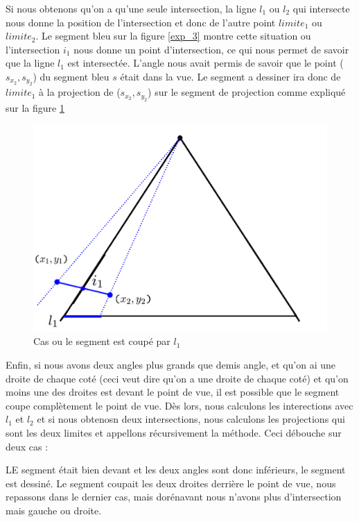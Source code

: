 \documentclass[11pt,a4paper]{article}
\theoremstyle{definition}
\theoremstyle{remark}
\begin{document}
Si nous obtenons qu'on a qu'une seule intersection, la ligne $l_1$ ou $l_2$ qui intersecte nous donne la position de l'intersection et donc de l'autre point $limite_1$ ou $limite_2$. Le segment bleu sur la figure \ref{exp_3} montre cette situation ou l'intersection $i_1$ nous donne un point d'intersection, ce qui nous permet de savoir que la ligne $l_1$ est intersectée. L'angle nous avait permis de savoir que le point ($s_{x_2},s_{y_2}$) du segment bleu $s$ était dans la vue. Le segment a dessiner ira donc de $limite_1$ à la projection de ($s_{x_2},s_{y_2}$) sur le segment de projection comme expliqué sur la figure \ref{cas2}

\begin{figure}[H]
\centering
\includegraphics[scale=0.6]{cas2.png}
\caption{Cas ou le segment est coupé par $l_1$}
\label{cas2}
\end{figure}

Enfin, si nous avons deux angles plus grands que demis angle, et qu'on ai une droite de chaque coté (ceci veut dire qu'on a une droite de chaque coté) et qu'on moins une des droites est devant le point de vue, il est possible que le segment coupe complètement le point de vue. Dès lors, nous calculons les interections avec $l_1$ et $l_2$ et si nous obtenosn deux intersections, nous calculons les projections qui sont les deux limites et appellons récursivement la méthode. Ceci débouche sur deux cas :

LE segment était bien devant et les deux angles sont donc inférieurs, le segment est dessiné.
Le segment coupait les deux droites derrière le point de vue, nous repassons dans le dernier cas, mais dorénavant nous n'avons plus d'intersection mais gauche ou droite.
\end{document}
